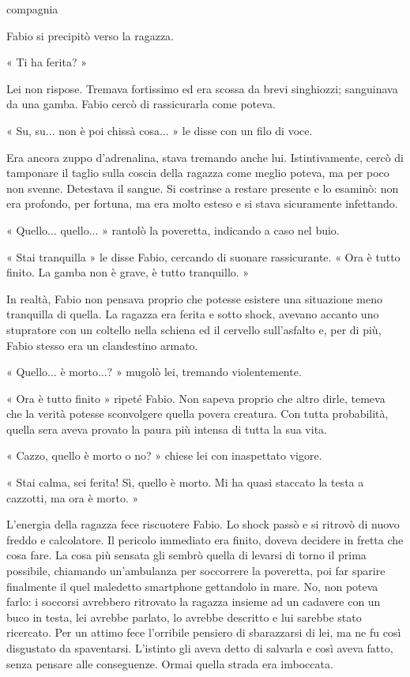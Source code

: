 compagnia


Fabio si precipitò verso la ragazza.

« Ti ha ferita? »

Lei non rispose. Tremava fortissimo ed era scossa da brevi singhiozzi; sanguinava da una gamba. Fabio cercò di rassicurarla come poteva.

« Su, su... non è poi chissà cosa... » le disse con un filo di voce.

Era ancora zuppo d'adrenalina, stava tremando anche lui. Istintivamente, cercò di tamponare il taglio sulla coscia della ragazza come meglio poteva, ma per poco non svenne. Detestava il sangue. Si costrinse a restare presente e lo esaminò: non era profondo, per fortuna, ma era molto esteso e si stava sicuramente infettando.

« Quello... quello... » rantolò la poveretta, indicando a caso nel buio.

« Stai tranquilla » le disse Fabio, cercando di suonare rassicurante. « Ora è tutto finito. La gamba non è grave, è tutto tranquillo. »

In realtà, Fabio non pensava proprio che potesse esistere una situazione meno tranquilla di quella. La ragazza era ferita e sotto shock, avevano accanto uno stupratore con un coltello nella schiena ed il cervello sull'asfalto e, per di più, Fabio stesso era un clandestino armato.

« Quello... è morto...? » mugolò lei, tremando violentemente.

« Ora è tutto finito » ripeté Fabio. Non sapeva proprio che altro dirle, temeva che la verità potesse sconvolgere quella povera creatura. Con tutta probabilità, quella sera aveva provato la paura più intensa di tutta la sua vita.

« Cazzo, quello è morto o no? » chiese lei con inaspettato vigore.

« Stai calma, sei ferita! Sì, quello è morto. Mi ha quasi staccato la testa a cazzotti, ma ora è morto. »

L'energia della ragazza fece riscuotere Fabio. Lo shock passò e si ritrovò di nuovo freddo e calcolatore. Il pericolo immediato era finito, doveva decidere in fretta che cosa fare. La cosa più sensata gli sembrò quella di levarsi di torno il prima possibile, chiamando un'ambulanza per soccorrere la poveretta, poi far sparire finalmente il quel maledetto smartphone gettandolo in mare. No, non poteva farlo: i soccorsi avrebbero ritrovato la ragazza insieme ad un cadavere con un buco in testa, lei avrebbe parlato, lo avrebbe descritto e lui sarebbe stato ricercato. Per un attimo fece l'orribile pensiero di sbarazzarsi di lei, ma ne fu così disgustato da spaventarsi. L'istinto gli aveva detto di salvarla e così aveva fatto, senza pensare alle conseguenze. Ormai quella strada era imboccata.

